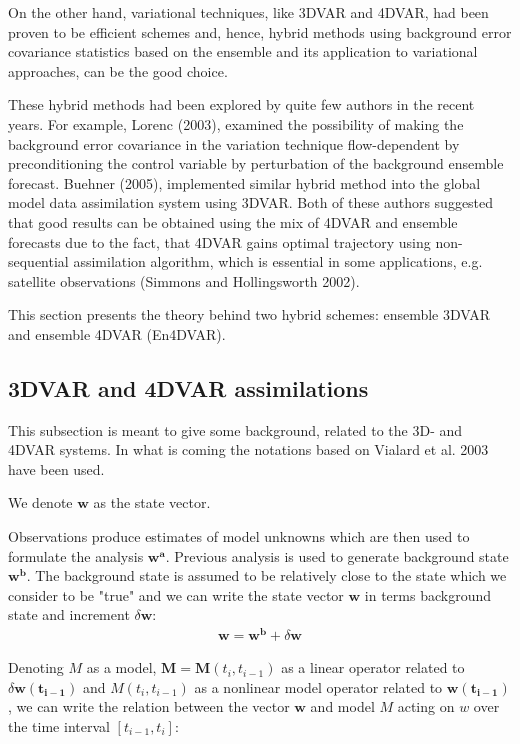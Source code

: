 \documentclass[a4,12pt]{article}
\begin{document}
On the other hand, variational techniques, like 3DVAR and 4DVAR, had been proven to be efficient schemes and, hence, hybrid methods using background error covariance statistics based on the ensemble and its application to variational approaches, can be the good choice.

These hybrid methods had been explored by quite few authors in the recent years. For example, Lorenc (2003), examined the possibility of making the background error covariance in the variation technique flow-dependent by preconditioning the control variable by perturbation of the background ensemble forecast.  Buehner (2005), implemented similar hybrid method into the global model data assimilation system using 3DVAR. Both of these authors suggested that good results can be obtained using the mix of 4DVAR and ensemble forecasts due to the fact, that 4DVAR gains optimal trajectory using non-sequential assimilation algorithm, which is essential in some applications, e.g. satellite observations (Simmons and
Hollingsworth 2002). 

This section presents the theory behind two hybrid schemes: ensemble 3DVAR and ensemble 4DVAR (En4DVAR). 

\subsection{3DVAR and 4DVAR assimilations}
This subsection is meant to give some background,  related to the 3D- and 4DVAR systems. In what is coming the notations based on Vialard et al. 2003 have been used.

We denote $\mathbf{w}$ as the state vector. 

Observations produce estimates of model unknowns which are then used to formulate the analysis $\mathbf{w^{a}}$. Previous analysis is used to generate background state $\mathbf{w^b}$. The background state is assumed to be relatively close to the state which we consider to be "true" and we can write the state vector $\mathbf {w}$ in terms background state and increment $\delta \mathbf {w}$:
\begin{align}
\mathbf{w} = \mathbf {w^{b}}+\delta \mathbf {w}
\end{align} 

Denoting $M$ as a model, $\mathbf {M} = \mathbf {M}(t_{i}, t_{i-1})$ as a linear operator related to $\delta \mathbf {w(t_{i-1})}$ and $M(t_{i},t_{i-1})$ as a nonlinear model operator related to $\mathbf {w(t_{i-1})}$, we can write the relation between the vector $\mathbf {w}$ and model $M$ acting on $w$ over the time interval $[t_{i-1},t_{i}]$:
\end{document}
